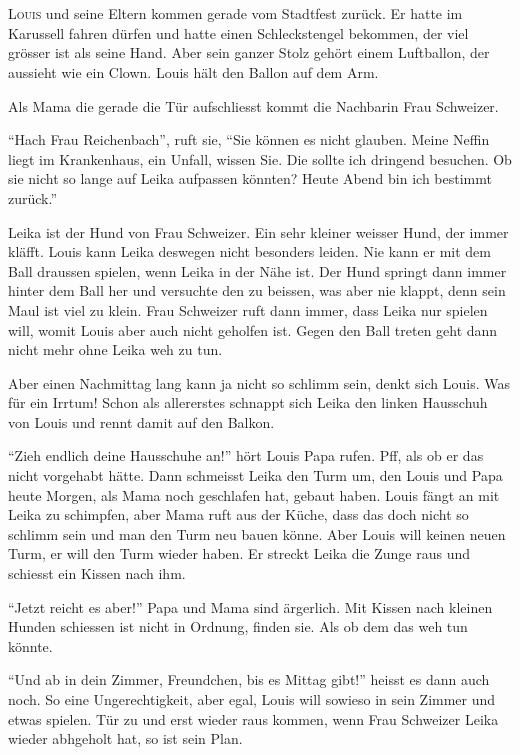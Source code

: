 \chapter*{}
\lettrine[lines=3]{\color{red}L}{ouis} und seine Eltern kommen gerade vom Stadtfest zurück. Er hatte im Karussell fahren dürfen und hatte einen Schleckstengel bekommen, der viel grösser ist als seine Hand. Aber sein ganzer Stolz gehört einem Luftballon, der aussieht wie ein Clown. Louis hält den Ballon auf dem Arm.

Als Mama die gerade die Tür aufschliesst kommt die Nachbarin Frau Schweizer.

\enquote{Hach Frau Reichenbach}, ruft sie, \enquote{Sie können es nicht glauben. Meine Neffin liegt im Krankenhaus, ein Unfall, wissen Sie. Die sollte ich dringend besuchen. Ob sie nicht so lange auf Leika aufpassen könnten? Heute Abend bin ich bestimmt zurück.}

Leika ist der Hund von Frau Schweizer. Ein sehr kleiner weisser Hund, der immer kläfft. Louis kann Leika deswegen nicht besonders leiden. Nie kann er mit dem Ball draussen spielen, wenn Leika in der Nähe ist. Der Hund springt dann immer hinter dem Ball her und versuchte den zu beissen, was aber nie klappt, denn sein Maul ist viel zu klein. Frau Schweizer ruft dann immer, dass Leika nur spielen will, womit Louis aber auch nicht geholfen ist. Gegen den Ball treten geht dann nicht mehr ohne Leika weh zu tun.

Aber einen Nachmittag lang kann ja nicht so schlimm sein, denkt sich Louis. Was für ein Irrtum! Schon als allererstes schnappt sich Leika den linken Hausschuh von Louis und rennt damit auf den Balkon.

\enquote{Zieh endlich deine Hausschuhe an!} hört Louis Papa rufen. Pff, als ob er das nicht vorgehabt hätte. Dann schmeisst Leika den Turm um, den Louis und Papa heute Morgen, als Mama noch geschlafen hat, gebaut haben. Louis fängt an mit Leika zu schimpfen, aber Mama ruft aus der Küche, dass das doch nicht so schlimm sein und man den Turm neu bauen könne. Aber Louis will keinen neuen Turm, er will den Turm wieder haben. Er streckt Leika die Zunge raus und schiesst ein Kissen nach ihm.

\enquote{Jetzt reicht es aber!} Papa und Mama sind ärgerlich. Mit Kissen nach kleinen Hunden schiessen ist nicht in Ordnung, finden sie. Als ob dem das weh tun könnte.

\enquote{Und ab in dein Zimmer, Freundchen, bis es Mittag gibt!} heisst es dann auch noch. So eine Ungerechtigkeit, aber egal, Louis will sowieso in sein Zimmer und etwas spielen. Tür zu und erst wieder raus kommen, wenn Frau Schweizer Leika wieder abhgeholt hat, so ist sein Plan.

